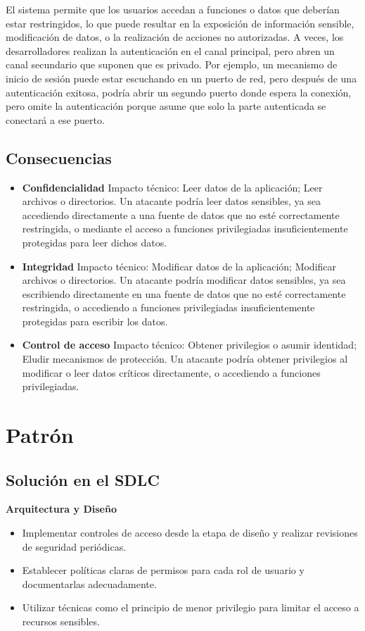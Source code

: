 El sistema permite que los usuarios accedan a funciones o datos que deberían estar restringidos, lo que puede resultar en la exposición de información sensible, modificación de datos, o la realización de acciones no autorizadas. A veces, los desarrolladores realizan la autenticación en el canal principal, pero abren un canal secundario que suponen que es privado. Por ejemplo, un mecanismo de inicio de sesión puede estar escuchando en un puerto de red, pero después de una autenticación exitosa, podría abrir un segundo puerto donde espera la conexión, pero omite la autenticación porque asume que solo la parte autenticada se conectará a ese puerto.

\subsection*{Consecuencias}
\begin{itemize} 
\item \textbf{Confidencialidad}
Impacto técnico: Leer datos de la aplicación; Leer archivos o directorios.
Un atacante podría leer datos sensibles, ya sea accediendo directamente a una fuente de datos que no esté correctamente restringida, o mediante el acceso a funciones privilegiadas insuficientemente protegidas para leer dichos datos.

\item \textbf{Integridad}
Impacto técnico: Modificar datos de la aplicación; Modificar archivos o directorios.
Un atacante podría modificar datos sensibles, ya sea escribiendo directamente en una fuente de datos que no esté correctamente restringida, o accediendo a funciones privilegiadas insuficientemente protegidas para escribir los datos.

\item \textbf{Control de acceso}
Impacto técnico: Obtener privilegios o asumir identidad; Eludir mecanismos de protección.
Un atacante podría obtener privilegios al modificar o leer datos críticos directamente, o accediendo a funciones privilegiadas.
\end{itemize}

\section{Patrón}

\subsection*{Solución en el SDLC} \textbf{Arquitectura y Diseño} \begin{itemize} \item Implementar controles de acceso desde la etapa de diseño y realizar revisiones de seguridad periódicas. \item Establecer políticas claras de permisos para cada rol de usuario y documentarlas adecuadamente. \item Utilizar técnicas como el principio de menor privilegio para limitar el acceso a recursos sensibles. \end{itemize}

